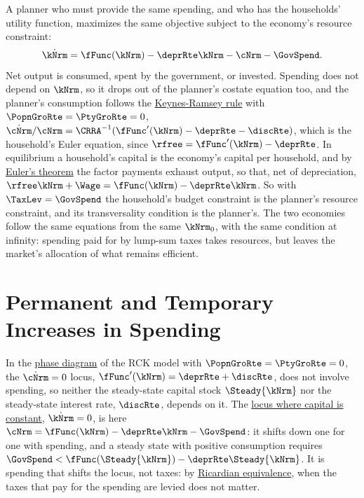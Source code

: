 \documentclass{econark}
\begin{document}
A planner who must provide the same spending, and who has the households' utility function, maximizes the same objective subject to the economy's resource constraint:
\begin{equation}
  \dot{\kNrm} = \fFunc(\kNrm) - \deprRte\kNrm - \cNrm - \GovSpend . \label{eq:RCKGov-kdot}
\end{equation}
Net output is consumed, spent by the government, or invested. Spending does not depend on $\kNrm$, so it drops out of the planner's costate equation too, and the planner's consumption follows the \href{https://intertemporal-choice.github.io/content/growth/ramseycasskoopmans/\#eq-cdotoc}{Keynes-Ramsey rule} with $\PopnGroRte=\PtyGroRte=0$, $\dot{\cNrm}/\cNrm = \CRRA^{-1}(\fFunc^{\prime}(\kNrm) - \deprRte - \discRte)$, which is the household's Euler equation, since $\rfree = \fFunc^{\prime}(\kNrm) - \deprRte$. In equilibrium a household's capital is the economy's capital per household, and by \href{https://intertemporal-choice.github.io/content/appendices/mathematical/mathfactslist/\#fact-eulerstheorem}{Euler's theorem} the factor payments exhaust output, so that, net of depreciation, $\rfree\kNrm + \Wage = \fFunc(\kNrm) - \deprRte\kNrm$. So with $\TaxLev = \GovSpend$ the household's budget constraint is the planner's resource constraint, and its transversality condition is the planner's. The two economies follow the same equations from the same $\kNrm_{0}$, with the same condition at infinity: spending paid for by lump-sum taxes takes resources, but leaves the market's allocation of what remains efficient.

\section{Permanent and Temporary Increases in Spending}\label{sec:RCKGov-Spending}

In the \href{https://intertemporal-choice.github.io/content/growth/ramseycasskoopmans/\#fig-ramseyssplot}{phase diagram} of the RCK model with $\PopnGroRte=\PtyGroRte=0$, the $\dot{\cNrm}=0$ locus, $\fFunc^{\prime}(\kNrm) = \deprRte + \discRte$, does not involve spending, so neither the steady-state capital stock $\Steady{\kNrm}$ nor the steady-state interest rate, $\discRte$, depends on it. The \href{https://intertemporal-choice.github.io/content/growth/ramseycasskoopmans/\#eq-rck-kdoteq0}{locus where capital is constant}, $\dot{\kNrm}=0$, is here $\cNrm = \fFunc(\kNrm) - \deprRte\kNrm - \GovSpend$: it shifts down one for one with spending, and a steady state with positive consumption requires $\GovSpend < \fFunc(\Steady{\kNrm}) - \deprRte\Steady{\kNrm}$. It is spending that shifts the locus, not taxes: by \hyperref[sec:RCKGov-Debt]{Ricardian equivalence}, when the taxes that pay for the spending are levied does not matter.
\end{document}
